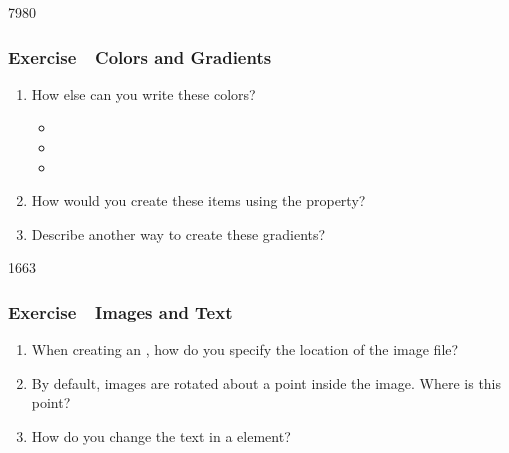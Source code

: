 \begin{slide}{7980}\frametitle{Exercise~\textendash~Colors and Gradients}

\begin{enumerate}
\item How else can you write these colors?
  \begin{itemize}
  \item {} %
  \item {} %
  \item {}
  \end{itemize}
\item How would you create these items using the  property?\\
\item Describe another way to create these gradients?
\end{enumerate}

\end{slide}

\begin{slide}{1663}\frametitle{Exercise~\textendash~Images and Text}

\begin{enumerate}
\item When creating an , how do you specify the location of
the image file?
\item By default, images are rotated about a point inside the image. Where is
this point?
\item How do you change the text in a  element?
\end{enumerate}

\end{slide}

